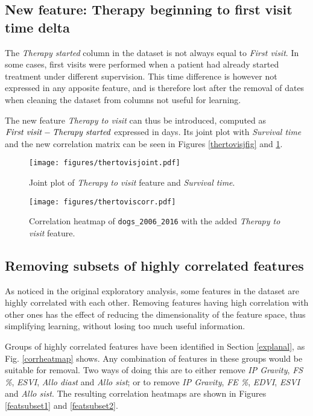 \documentclass[12pt]{report}
\begin{document}
\subsection*{New feature: Therapy beginning to first visit time delta}
The \textit{Therapy started} column in the dataset is not always equal to \textit{First visit}. In some cases, first visits were performed when a patient had already started treatment under different supervision. This time difference is however not expressed in any apposite feature, and is therefore lost after the removal of dates when cleaning the dataset from columns not useful for learning.

The new feature \textit{Therapy to visit} can thus be introduced, computed as $ \text{\emph{First visit}} - \text{\emph{Therapy started}} $ expressed in days. Its joint plot with \textit{Survival time} and the new correlation matrix can be seen in Figures \ref{thertovisjfig} and \ref{thertoviscfig}.

\begin{figure}[hp]
  \centering
  	\texttt{[image: figures/thertovisjoint.pdf]}
  \caption{Joint plot of \textit{Therapy to visit} feature and \textit{Survival time}.}
  \label{thertovisjfig}
  \vspace{0.7cm}
  \centering
  	\texttt{[image: figures/thertoviscorr.pdf]}
  \caption{Correlation heatmap of \texttt{dogs\_2006\_2016} with the added \textit{Therapy to visit} feature.}
  \label{thertoviscfig}
\end{figure}

\subsection*{Removing subsets of highly correlated features}
As noticed in the original exploratory analysis, some features in the dataset are highly correlated with each other. Removing features having high correlation with other ones has the effect of reducing the dimensionality of the feature space, thus simplifying learning, without losing too much useful information.

Groups of highly correlated features have been identified in Section \ref{explanal}, as Fig. \ref{corrheatmap} shows. Any combination of features in these groups would be suitable for removal. Two ways of doing this are to either remove \textit{IP Gravity}, \textit{FS \%}, \textit{ESVI}, \textit{Allo diast} and \textit{Allo sist}; or to remove \textit{IP Gravity}, \textit{FE \%}, \textit{EDVI}, \textit{ESVI} and \textit{Allo sist}. The resulting correlation heatmaps are shown in Figures \ref{featsubset1} and \ref{featsubset2}.
\end{document}
